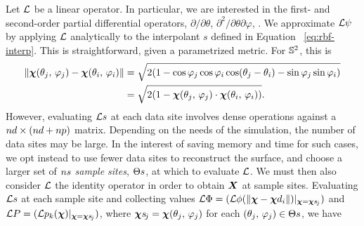 Let $\mathcal{L}$ be a linear operator. In particular, we are interested in the first- and
second-order partial differential operators, $\partial/\partial\theta$,
$\partial^2/\partial\theta\partial\varphi$, . We approximate $\mathcal{L}\psi$ by
applying $\mathcal{L}$ analytically to the interpolant $s$ defined in Equation~%
\eqref{eq:rbf-interp}. This is straightforward, given a parametrized metric. For
$\mathbb{S}^2$, this is
\begin{equation}\label{eq:sphere-metric}
    \begin{aligned}
    \|\boldsymbol{\chi}(\theta_j,\,\varphi_j) - \boldsymbol{\chi}(\theta_i,\,\varphi_i)\|
    &= \sqrt{2(1 - \cos\varphi_j\cos\varphi_i\cos(\theta_j-\theta_i) - \sin\varphi_j\sin\varphi_i)} \\
    &= \sqrt{2(1-\boldsymbol{\chi}(\theta_j,\,\varphi_j)\cdot\boldsymbol{\chi}(\theta_i,\,\varphi_i))}.
\end{aligned}
\end{equation}
However, evaluating $\mathcal{L} s$ at each data site involves dense operations against a
$\data\cardinality\times(\data\cardinality+\poly\cardinality)$ matrix. Depending on the
needs of the simulation, the number of data sites may be large.  In the interest of
saving memory and time for such cases, we opt instead to use fewer data sites to
reconstruct the surface, and choose a larger set of $\sample\cardinality$ \emph{sample
sites}, $\sample\sites$, at which to evaluate $\mathcal{L}$. We must then also consider $\mathcal{L}$ the
identity operator in order
to obtain $\boldsymbol{X}$ at sample sites. Evaluating $\mathcal{L} s$ at each sample site
and collecting values $\L\Phi = (\L\phi(\|\Xp-\data\Xp_i\|)|_{\Xp=\Xpsj})$ and
$\L P = (\L p_k(\Xp)|_{\Xp=\Xpsj})$, where $\Xpsj = \Xp(\theta_j,\,\varphi_j)$ for each
$(\theta_j,\,\varphi_j)\in\sample\sites$, we have
